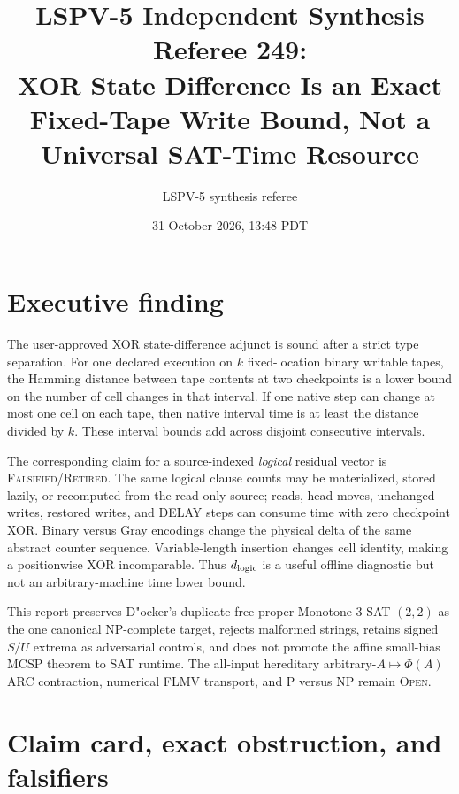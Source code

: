 \documentclass[11pt]{article}
\title{LSPV-5 Independent Synthesis Referee 249:\\
XOR State Difference Is an Exact Fixed-Tape Write Bound, Not a Universal SAT-Time Resource}
\author{LSPV-5 synthesis referee}
\date{31 October 2026, 13:48 PDT}
\newcommand{\Status}[1]{\textsc{#1}}
\begin{document}
\maketitle

\section*{Executive finding}
The user-approved XOR state-difference adjunct is sound after a strict type
separation.  For one declared execution on $k$ fixed-location binary writable
tapes, the Hamming distance between tape contents at two checkpoints is a lower
bound on the number of cell changes in that interval.  If one native step can
change at most one cell on each tape, then native interval time is at least the
distance divided by $k$.  These interval bounds add across disjoint consecutive
intervals.

The corresponding claim for a source-indexed \emph{logical} residual vector is
\Status{Falsified/Retired}.  The same logical clause counts may be materialized,
stored lazily, or recomputed from the read-only source; reads, head moves,
unchanged writes, restored writes, and DELAY steps can consume time with zero
checkpoint XOR.  Binary versus Gray encodings change the physical delta of the
same abstract counter sequence.  Variable-length insertion changes cell
identity, making a positionwise XOR incomparable.  Thus $d_{\rm logic}$ is a
useful offline diagnostic but not an arbitrary-machine time lower bound.

This report preserves D"ocker's duplicate-free proper Monotone
$3$-SAT-$(2,2)$ as the one canonical NP-complete target, rejects malformed
strings, retains signed $S/U$ extrema as adversarial controls, and does not
promote the affine small-bias MCSP theorem to SAT runtime.  The all-input
hereditary arbitrary-$A\mapsto\Phi(A)$ ARC contraction, numerical FLMV
transport, and P versus NP remain \Status{Open}.

\section{Claim card, exact obstruction, and falsifiers}
\end{document}
